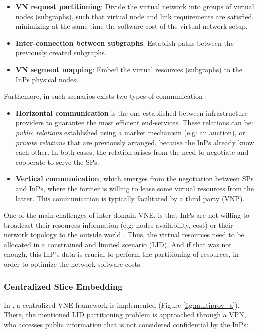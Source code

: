 \begin{itemize}
	\item \textbf{VN request partitioning}: Divide the virtual network into groups of virtual nodes (subgraphs), such that virtual node and link requirements are satisfied, minimizing at the same time the software cost of the virtual network setup.
		\item \textbf{Inter-connection between subgraphs}: Establish paths between the previously created subgraphs.
	\item \textbf{VN segment mapping}: Embed the virtual resources (subgraphs) to the InPs physical nodes.
\end{itemize}

Furthemore, in such scenarios exists two types of communication \citep{zaheer2010multi}:

\begin{itemize}	
	\item \textbf{Horizontal communication} is the one established between infrastructure providers to guarantee the most efficient end-services. These relations can be: \textit{public relations} established using a market mechanism (e.g: an auction), or \textit{private relations} that are previously arranged, because the InPs already know each other. In both cases, the relation arises from the need to negotiate and cooperate to serve the SPs.
	\item \textbf{Vertical communication}, which emerges from the negotiation between SPs and InPs, where the former is willing to lease some virtual resources from the latter. This communication is typically facilitated by a third party (VNP).
\end{itemize}

One of the main challenges of inter-domain VNE, is that InPs are not willing to broadcast their resources information (e.g: nodes availability, cost) or their network topology to the outside world \citep{dietrich2015multi}. Thus, the virtual resources need to be allocated in a constrained and limited scenario (LID). And if that was not enough, this InP's data is crucial to perform the partitioning of resources, in order to optimize the network software costs.

\subsubsection{Centralized Slice Embedding}

In \citep{dietrich2015multi}, a centralized VNE framework is implemented (Figure \ref{fig:multiprov_a}). There, the mentioned LID partitioning problem is approached through a VPN, who accesses public information that is not considered confidential by the InPs:

